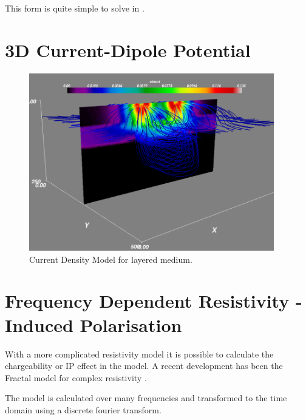 This form is quite simple to solve in \esc.

\section{3D Current-Dipole Potential}

\begin{figure}[ht]
\centering
\includegraphics[width=0.95\textwidth]{figures/ex11cstreamline.png}
\caption{Current Density Model for layered medium.}
\label{fig:ex11cstream}
\end{figure}

\section{Frequency Dependent Resistivity - Induced Polarisation}
With a more complicated resistivity model it is possible to calculate the
chargeability or IP effect in the model. A recent development has been the
Fractal model for complex resistivity \citep{Farias2010,Honig2007}.


The model is calculated over many frequencies and transformed to the time
domain using a discrete fourier transform.

